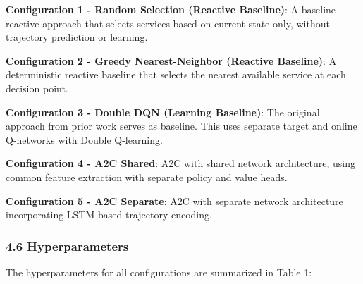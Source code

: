 \textbf{Configuration 1 - Random Selection (Reactive Baseline)}: A
baseline reactive approach that selects services based on current state
only, without trajectory prediction or learning.

\textbf{Configuration 2 - Greedy Nearest-Neighbor (Reactive Baseline)}:
A deterministic reactive baseline that selects the nearest available
service at each decision point.

\textbf{Configuration 3 - Double DQN (Learning Baseline)}: The original
approach from prior work serves as baseline. This uses separate target
and online Q-networks with Double Q-learning.

\textbf{Configuration 4 - A2C Shared}: A2C with shared network
architecture, using common feature extraction with separate policy and
value heads.

\textbf{Configuration 5 - A2C Separate}: A2C with separate network
architecture incorporating LSTM-based trajectory encoding.

\hypertarget{hyperparameters}{%
	\subsubsection{4.6 Hyperparameters}\label{hyperparameters}}

The hyperparameters for all configurations are summarized in Table 1:

